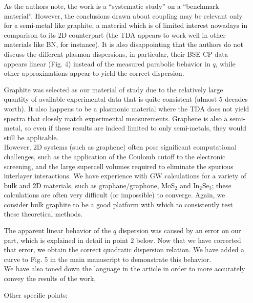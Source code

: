 \documentclass[aps,prb,10pt,endfloats]{revtex4-1}
\begin{document}
As the authors note, the work is a ``systematic study'' on a ``benchmark
material''. However, the conclusions drawn about coupling may be relevant only
for a semi-metal like graphite, a material which is of limited interest nowadays
in comparison to its 2D counterpart (the TDA appears to work well in other
materials like BN, for instance). It is also disappointing that the authors do
not discuss the different plasmon dispersions, in particular, their BSE-CP data
appears linear (Fig. 4) instead of the measured parabolic behavior in $q$, while
other approximations appear to yield the correct dispersion.
\begin{shaded*}
Graphite was selected as our material of study due to the relatively large
quantity of available experimental data that is quite consistent (almost 5
decades worth). It also happens to be a plasmonic material where the TDA does
not yield spectra that closely match experimental measurements. Graphene is also
a semi-metal, so even if these results are indeed limited to only semi-metals,
they would still be applicable.\\

However, 2D systems (such as graphene) often pose significant computational
challenges, such as the application of the Coulomb cutoff to the electronic
screening, and the large supercell volumes required to eliminate the spurious
interlayer interactions. We have experience with GW calculations for a variety
of bulk and 2D materials, such as graphane/graphone, $\textrm{MoS}_{2}$ and
$\textrm{In}_{2}\textrm{Se}_{3}$; these calculations are often very difficult
(or impossible) to converge. Again, we consider bulk graphite to be a good
platform with which to consistently test these theoretical methods.

The apparent linear behavior of the $q$ dispersion was caused by an error on our
part, which is explained in detail in point 2 below. Now that we have corrected
that error, we obtain the correct quadratic dispersion relation. We have added a
curve to Fig. 5 in the main manuscript to demonstrate this behavior.\\

We have also toned down the language in the article in order to more accurately
convey the results of the work.
\end{shaded*}

Other specific points:
\end{document}
